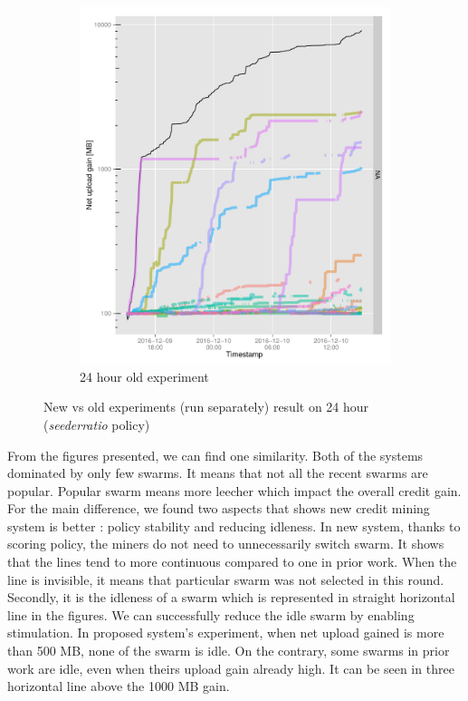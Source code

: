 \begin{figure}[h]
\begin{adjustwidth}{-1.5cm}{}
\begin{subfigure}[t]{0.6\textwidth}
			\includegraphics[width=\textwidth]{pics/results/m138.pdf}
			\caption{24 hour old experiment}
			\label{fig:oldetree24}
		\end{subfigure}
		\caption{New vs old experiments (run separately) result on 24 hour (\textit{seederratio} policy)}
	\end{adjustwidth}
\end{figure}
From the figures presented, we can find one similarity. Both of the systems dominated by only few swarms. It means that not all the recent swarms are popular. Popular swarm means more leecher which impact the overall credit gain. For the main difference, we found two aspects that shows new credit mining system is better : policy stability and reducing idleness. In new system, thanks to scoring policy, the miners do not need to unnecessarily switch swarm. It shows that the lines tend to more continuous compared to one in prior work. When the line is invisible, it means that particular swarm was not selected in this round. Secondly, it is the idleness of a swarm which is represented in straight horizontal line in the figures. We can successfully reduce the idle swarm by enabling stimulation. In proposed system's experiment, when net upload gained is more than 500 MB, none of the swarm is idle. On the contrary, some swarms in prior work are idle, even when theirs upload gain already high. It can be seen in three horizontal line above the 1000 MB gain.

